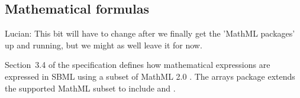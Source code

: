 \subsection{Mathematical formulas}
\label{math-formulas}

{\color{red} Lucian: \notice This bit will have to change after we finally get the 'MathML packages' up and running, but we might as well leave it for now.}


Section~3.4 of the \sbmlthreecore specification defines how mathematical expressions are expressed in SBML using a subset of MathML 2.0 \citep{w3c:2000b}.
The arrays package extends the supported MathML subset to include  and .
